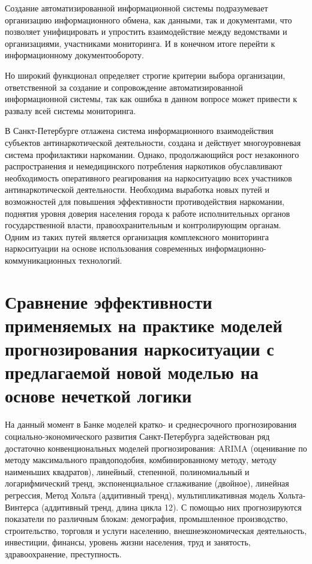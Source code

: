 Создание автоматизированной информационной системы подразумевает организацию
информационного обмена, как данными, так и документами, что позволяет
унифицировать и упростить взаимодействие между ведомствами и организациями,
участниками мониторинга. И в конечном итоге перейти к информационному
документообороту. 

Но широкий функционал определяет строгие критерии выбора организации,
ответственной за создание и сопровождение автоматизированной информационной
системы, так как ошибка в данном вопросе может привести к развалу всей системы
мониторинга.

В Санкт-Петербурге отлажена система информационного взаимодействия субъектов
антинаркотической деятельности, создана и действует многоуровневая система
профилактики наркомании. Однако, продолжающийся рост незаконного распространения
и немедицинского потребления наркотиков обуславливают необходимость оперативного
реагирования на наркоситуацию всех участников антинаркотической деятельности.
Необходима выработка новых путей и возможностей для повышения эффективности
противодействия наркомании, поднятия уровня доверия населения города к работе
исполнительных органов государственной власти,  правоохранительным и
контролирующим органам. Одним из таких путей является организация комплексного
мониторинга наркоситуации на основе использования современных
информационно-коммуникационных технологий.

\section{Сравнение эффективности применяемых на практике моделей прогнозирования
    наркоситуации с предлагаемой новой моделью на основе нечеткой логики}

На данный момент в Банке моделей кратко- и среднесрочного прогнозирования
социально-экономического развития Санкт-Петербурга задействован ряд достаточно
конвенциональных моделей прогнозирования: ARIMA (оценивание по методу
максимального правдоподобия, комбинированному методу, методу наименьших
квадратов), линейный, степенной, полиномиальный и логарифмический тренд,
экспоненциальное сглаживание (двойное), линейная регрессия, Метод Хольта
(аддитивный тренд), мультипликативная модель Хольта-Винтерса (аддитивный тренд,
длина цикла 12). С помощью них прогнозируются показатели по различным блокам:
демография, промышленное производство, строительство, торговля и услуги
населению, внешнеэкономическая деятельность, инвестиции, финансы, уровень жизни
населения, труд и занятость, здравоохранение, преступность.

